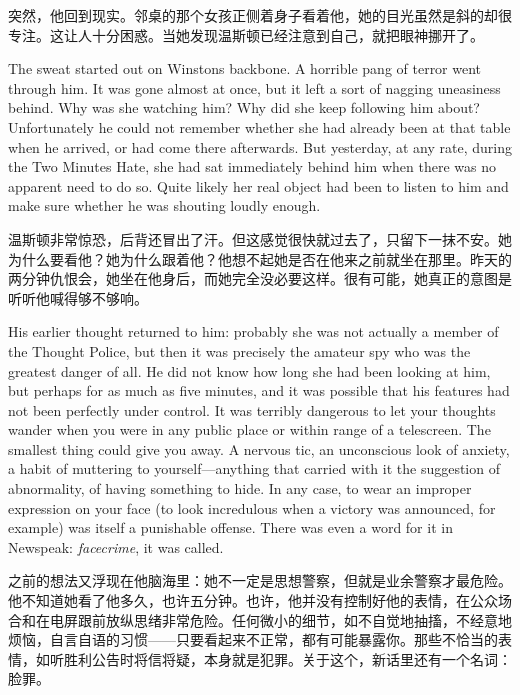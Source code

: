 \begin{paracol}{2}
突然，他回到现实。邻桌的那个女孩正侧着身子看着他，她的目光虽然是斜的却很专注。这让人十分困惑。当她发现温斯顿已经注意到自己，就把眼神挪开了。

\switchcolumn*

The sweat started out on Winston\textquotesingle s backbone. A horrible
pang of terror went through him. It was gone almost at once, but it left
a sort of nagging uneasiness behind. Why was she watching him? Why did
she keep following him about? Unfortunately he could not remember
whether she had already been at that table when he arrived, or had come
there afterwards. But yesterday, at any rate, during the Two Minutes
Hate, she had sat immediately behind him when there was no apparent need
to do so. Quite likely her real object had been to listen to him and
make sure whether he was shouting loudly enough.

\switchcolumn

温斯顿非常惊恐，后背还冒出了汗。但这感觉很快就过去了，只留下一抹不安。她为什么要看他？她为什么跟着他？他想不起她是否在他来之前就坐在那里。昨天的两分钟仇恨会，她坐在他身后，而她完全没必要这样。很有可能，她真正的意图是听听他喊得够不够响。

\switchcolumn*

His earlier thought returned to him: probably she was not actually a
member of the Thought Police, but then it was precisely the amateur spy
who was the greatest danger of all. He did not know how long she had
been looking at him, but perhaps for as much as five minutes, and it was
possible that his features had not been perfectly under control. It was
terribly dangerous to let your thoughts wander when you were in any
public place or within range of a telescreen. The smallest thing could
give you away. A nervous tic, an unconscious look of anxiety, a habit of
muttering to yourself---anything that carried with it the suggestion of
abnormality, of having something to hide. In any case, to wear an
improper expression on your face (to look incredulous when a victory was
announced, for example) was itself a punishable offense. There was even
a word for it in Newspeak: \emph{facecrime}, it was called.

\switchcolumn

之前的想法又浮现在他脑海里：她不一定是思想警察，但就是业余警察才最危险。他不知道她看了他多久，也许五分钟。也许，他并没有控制好他的表情，在公众场合和在电屏跟前放纵思绪非常危险。任何微小的细节，如不自觉地抽搐，不经意地烦恼，自言自语的习惯——只要看起来不正常，都有可能暴露你。那些不恰当的表情，如听胜利公告时将信将疑，本身就是犯罪。关于这个，新话里还有一个名词：脸罪。


\end{paracol}
